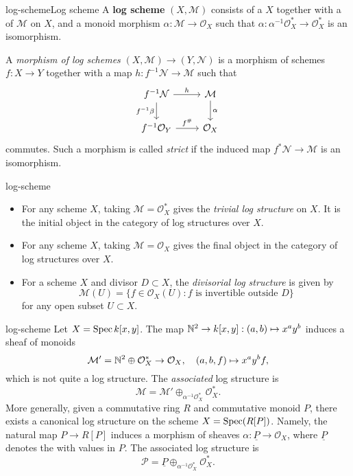 \begin{topic}{log-scheme}{Log scheme}
    A \textbf{log scheme} $(X, \mathcal{M})$ consists of a  $X$ together with a  of  $\mathcal{M}$ on $X$, and a monoid morphism $\alpha \colon \mathcal{M} \to \mathcal{O}_X$ such that $\alpha \colon \alpha^{-1} \mathcal{O}_X^* \to \mathcal{O}_X^*$ is an isomorphism.
    
    A \textit{morphism of log schemes} $(X, \mathcal{M}) \to (Y, \mathcal{N})$ is a morphism of schemes $f \colon X \to Y$ together with a map $h \colon f^{-1} \mathcal{N} \to \mathcal{M}$ such that
    \[ \svg \begin{tikzcd} f^{-1} \mathcal{N} \arrow{r}{h} \arrow[swap]{d}{f^{-1} \beta} & \mathcal{M} \arrow{d}{\alpha} \\ f^{-1} \mathcal{O}_Y \arrow{r}{f^\#} & \mathcal{O}_X \end{tikzcd} \]
    commutes. Such a morphism is called \textit{strict} if the induced map $f^* \mathcal{N} \to \mathcal{M}$ is an isomorphism.
\end{topic}

\begin{example}{log-scheme}
    \begin{itemize}
        \item For any scheme $X$, taking $\mathcal{M} = \mathcal{O}_X^*$ gives the \textit{trivial log structure} on $X$. It is the initial object in the category of log structures over $X$.
        \item For any scheme $X$, taking $\mathcal{M} = \mathcal{O}_X$ gives the final object in the category of log structures over $X$.
        \item For a scheme $X$ and divisor $D \subset X$, the \textit{divisorial log structure} is given by
        \[ \mathcal{M}(U) = \{ f \in \mathcal{O}_X(U) : f \text{ is invertible outside $D$} \} \]
        for any open subset $U \subset X$. 
    \end{itemize}
\end{example}

\begin{example}{log-scheme}
    Let $X = \operatorname{Spec} k[x, y]$. The map $\mathbb{N}^2 \to k[x, y] : (a, b) \mapsto x^a y^b$ induces a sheaf of monoids
    \[ \mathcal{M}' = \mathbb{N}^2 \oplus \mathcal{O}_X^* \to \mathcal{O}_X , \quad (a, b, f) \mapsto x^a y^b f , \]
    which is not quite a log structure. The \textit{associated} log structure is
    \[ \mathcal{M} = \mathcal{M}' \oplus_{\alpha^{-1} \mathcal{O}_X^*} \mathcal{O}_X^* . \]
    More generally, given a commutative ring $R$ and commutative monoid $P$, there exists a canonical log structure on the scheme $X = \operatorname{Spec}(R[P])$. Namely, the natural map $P \to R[P]$ induces a morphism of sheaves $\alpha \colon \underline{P} \to \mathcal{O}_X$, where $\underline{P}$ denotes the  with values in $P$. The associated log structure is
    \[ \mathcal{P} = \underline{P} \oplus_{\alpha^{-1} \mathcal{O}_X^*} \mathcal{O}_X^* . \]
\end{example}

